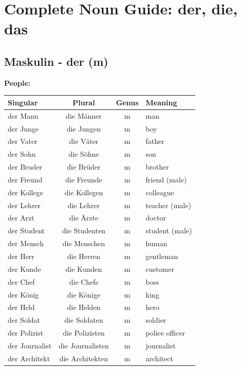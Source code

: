 \chapter{Complete Noun Guide: der, die, das}
\label{cha:NomenGuide}

\section{Maskulin - der (m)}
\label{sec:MaskulinNomen}

\bigskip
\noindent\textbf{People:}

\begin{center}
\begin{tabular}{|l|c|c|l|}
\hline
Singular & Plural & Genus & Meaning \\ \hline
der Mann & die Männer & m & man \\ \hline
der Junge & die Jungen & m & boy \\ \hline
der Vater & die Väter & m & father \\ \hline
der Sohn & die Söhne & m & son \\ \hline
der Bruder & die Brüder & m & brother \\ \hline
der Freund & die Freunde & m & friend (male) \\ \hline
der Kollege & die Kollegen & m & colleague \\ \hline
der Lehrer & die Lehrer & m & teacher (male) \\ \hline
der Arzt & die Ärzte & m & doctor \\ \hline
der Student & die Studenten & m & student (male) \\ \hline
der Mensch & die Menschen & m & human \\ \hline
der Herr & die Herren & m & gentleman \\ \hline
der Kunde & die Kunden & m & customer \\ \hline
der Chef & die Chefs & m & boss \\ \hline
der König & die Könige & m & king \\ \hline
der Held & die Helden & m & hero \\ \hline
der Soldat & die Soldaten & m & soldier \\ \hline
der Polizist & die Polizisten & m & police officer \\ \hline
der Journalist & die Journalisten & m & journalist \\ \hline
der Architekt & die Architekten & m & architect \\ \hline
\end{tabular}
\end{center}

